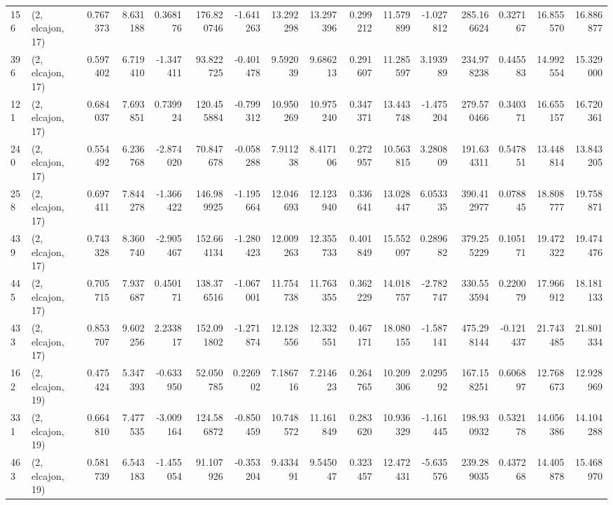 \begin{tabular}{llrrrrrrrrrrrrrr}
156 &  (2, elcajon, 17) &   0.767373 &   8.631188 &   0.368176 &   176.820746 &  -1.641263 &  13.292298 &  13.297396 &  0.299212 &  11.579899 &  -1.027812 &   285.166624 &  0.327167 &  16.855570 &  16.886877 \\
396 &  (2, elcajon, 17) &   0.597402 &   6.719410 &  -1.347411 &    93.822725 &  -0.401478 &   9.592039 &   9.686213 &  0.291607 &  11.285597 &   3.193989 &   234.978238 &  0.445583 &  14.992554 &  15.329000 \\
121 &  (2, elcajon, 17) &   0.684037 &   7.693851 &   0.739924 &   120.455884 &  -0.799312 &  10.950269 &  10.975240 &  0.347371 &  13.443748 &  -1.475204 &   279.570466 &  0.340371 &  16.655157 &  16.720361 \\
240 &  (2, elcajon, 17) &   0.554492 &   6.236768 &  -2.874020 &    70.847678 &  -0.058288 &   7.911238 &   8.417106 &  0.272957 &  10.563815 &   3.280809 &   191.634311 &  0.547851 &  13.448814 &  13.843205 \\
258 &  (2, elcajon, 17) &   0.697411 &   7.844278 &  -1.366422 &   146.989925 &  -1.195664 &  12.046693 &  12.123940 &  0.336641 &  13.028447 &   6.053335 &   390.412977 &  0.078845 &  18.808777 &  19.758871 \\
439 &  (2, elcajon, 17) &   0.743328 &   8.360740 &  -2.905467 &   152.664134 &  -1.280423 &  12.009263 &  12.355733 &  0.401849 &  15.552097 &   0.289682 &   379.255229 &  0.105171 &  19.472322 &  19.474476 \\
445 &  (2, elcajon, 17) &   0.705715 &   7.937687 &   0.450171 &   138.376516 &  -1.067001 &  11.754738 &  11.763355 &  0.362229 &  14.018757 &  -2.782747 &   330.553594 &  0.220079 &  17.966912 &  18.181133 \\
433 &  (2, elcajon, 17) &   0.853707 &   9.602256 &   2.233817 &   152.091802 &  -1.271874 &  12.128556 &  12.332551 &  0.467171 &  18.080155 &  -1.587141 &   475.298144 & -0.121437 &  21.743485 &  21.801334 \\
162 &  (2, elcajon, 19) &   0.475424 &   5.347393 &  -0.633950 &    52.050785 &   0.226902 &   7.186716 &   7.214623 &  0.264765 &  10.209306 &   2.029592 &   167.158251 &  0.606897 &  12.768673 &  12.928969 \\
331 &  (2, elcajon, 19) &   0.664810 &   7.477535 &  -3.009164 &   124.586872 &  -0.850459 &  10.748572 &  11.161849 &  0.283620 &  10.936329 &  -1.161445 &   198.930932 &  0.532178 &  14.056386 &  14.104288 \\
463 &  (2, elcajon, 19) &   0.581739 &   6.543183 &  -1.455054 &    91.107926 &  -0.353204 &   9.433491 &   9.545047 &  0.323457 &  12.472431 &  -5.635576 &   239.289035 &  0.437268 &  14.405878 &  15.468970 \\

\end{tabular}
